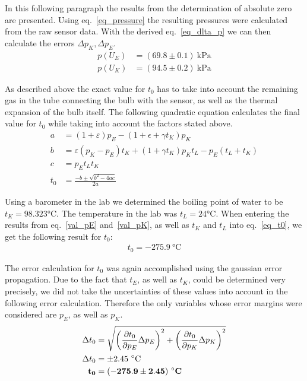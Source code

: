     In this following paragraph the results from the determination of absolute zero are presented.
    Using eq.~\ref{eq_pressure} the resulting pressures were calculated from the raw sensor data.
    With the derived eq.~\ref{eq_dlta_p} we can then calculate the errors $\Delta p_K, \Delta p_E$. %
    \begin{align}
        p(U_E) &= (69.8 \pm 0.1) ~\si{\kilo\pascal} \label{val_pE}\\
        p(U_K) &= (94.5 \pm 0.2) ~\si{\kilo\pascal} \label{val_pK}
    \end{align}

    As described above the exact value for $t_0$ has to take into account the remaining gas
    in the tube connecting the bulb with the sensor, as well as the thermal expansion of the
    bulb itself. The following quadratic equation calculates the final value for $t_0$ while
    taking into account the factors stated above.
    \begin{align}
        a &= (1 + \varepsilon)p_E - (1 + \epsilon + \gamma t_K)p_K\\
        b &= \varepsilon(p_K - p_E)t_K + (1 + \gamma t_K)p_K t_L - p_E(t_L + t_K)\\
        c &= p_E t_L t_K\\
        t_0 &= \frac{-b \pm \sqrt{b^2 - 4a c}}{2a} \label{eq_t0}
    \end{align}

    Using a barometer in the lab we determined the boiling point of water to be $t_K = 98.323 \si{\celsius}$.
    The temperature in the lab was $t_L = 24 \si{\celsius}$.
    When entering the results from eq.~\ref{val_pE} and~\ref{val_pK}, as well as $t_K$ and $t_L$ into eq.~\ref{eq_t0},
    we get the following result for $t_0$:
    \begin{align}
        t_0 = -275.9~\si{\celsius} \label{val_t0}
    \end{align}

    The error calculation for $t_0$ was again accomplished using the gaussian error propagation.
    Due to the fact that $t_E$, as well as $t_K$, could be determined very precisely, we did not take
    the uncertainties of these values into account in the following error calculation.
    Therefore the only variables whose error margins were considered are $p_E$, as well as $p_K$. %
    \begin{align}
        \Delta t_0 &= \sqrt{ \left(\frac{\partial t_0}{\partial p_E} \Delta p_E \right)^2 +
                            \left(\frac{\partial t_0}{\partial p_K} \Delta p_K \right)^2 }\\
        \Delta t_0 &= \pm 2.45~\si{\celsius} \label{dlta_t0}\\
        \bf t_0 &= \bf (-275.9 \pm 2.45)~\si{\bf\celsius} \label{res_t0}
    \end{align}


